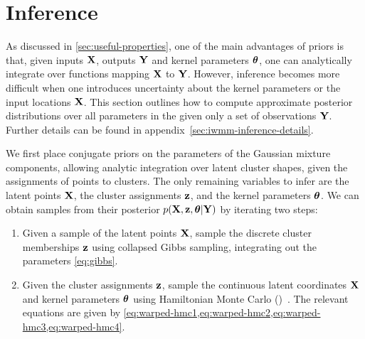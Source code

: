 




\section{Inference}
\label{sec:iwmm-inference}

As discussed in \cref{sec:useful-properties}, one of the main advantages of \gp{} priors is that, given inputs $\mathbf{X}$, outputs $\mathbf{Y}$ and kernel parameters ${\boldsymbol{\theta}}$, one can analytically integrate over functions mapping $\mathbf{X}$ to $\mathbf{Y}$.
However, inference becomes more difficult when one introduces uncertainty about the kernel parameters or the input locations $\mathbf{X}$.
This section outlines how to compute approximate posterior distributions over all parameters in the \iwmm{} given only a set of observations $\mathbf{Y}$.
Further details can be found in appendix~\ref{sec:iwmm-inference-details}.

We first place conjugate priors on the parameters of the Gaussian mixture components, allowing analytic integration over latent cluster shapes, given the assignments of points to clusters.
The only remaining variables to infer are the latent points $\mathbf{X}$, the cluster assignments ${\bf{z}}$, and the kernel parameters ${\boldsymbol{\theta}}$.
%
%
We can obtain samples from their posterior 
$p(\mathbf{X},{\bf{z}}, {\boldsymbol{\theta}} | \mathbf{Y})$ by iterating two steps:
%
\begin{enumerate}

\item Given a sample of the latent points $\mathbf{X}$, sample the discrete cluster memberships ${\bf{z}}$ using collapsed Gibbs sampling, integrating out the \iGMM{} parameters \eqref{eq:gibbs}.

\item Given the cluster assignments ${\bf{z}}$, sample the continuous latent coordinates $\mathbf{X}$ and kernel parameters ${\boldsymbol{\theta}}$ using Hamiltonian Monte Carlo (\HMC{})~\citep[chapter 30]{mackay2003information}.
The relevant equations are given by \cref{eq:warped-hmc1,eq:warped-hmc2,eq:warped-hmc3,eq:warped-hmc4}.
\end{enumerate}

